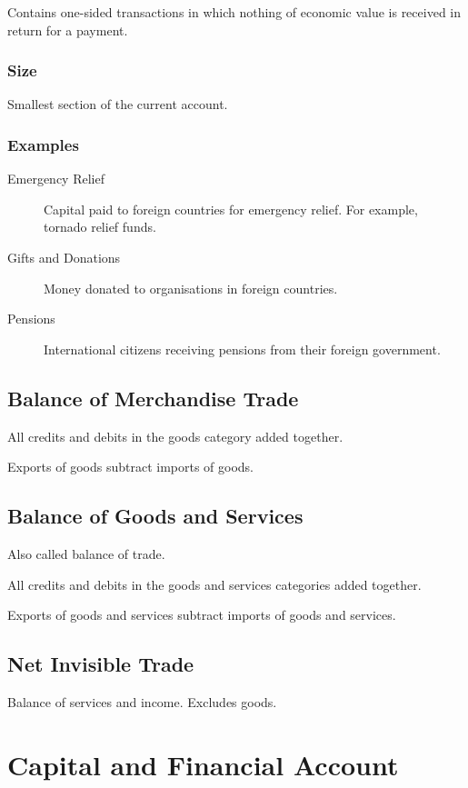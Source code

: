 \documentclass[a4paper,11pt]{report}
\begin{document}
Contains one-sided transactions in which nothing of economic value is received
in return for a payment.

\subsubsection{Size}

Smallest section of the current account.

\subsubsection{Examples}

\begin{description}
\item [Emergency Relief] Capital paid to foreign countries for emergency
	relief. For example, tornado relief funds.
\item [Gifts and Donations] Money donated to organisations in foreign countries.
\item [Pensions] International citizens receiving pensions from their foreign
	government.
\end{description}

\subsection{Balance of Merchandise Trade}

All credits and debits in the goods category added together.

Exports of goods subtract imports of goods.

\subsection{Balance of Goods and Services}

Also called balance of trade.

All credits and debits in the goods and services categories added together.

Exports of goods and services subtract imports of goods and services.

\subsection{Net Invisible Trade}

Balance of services and income. Excludes goods.


\section{Capital and Financial Account}
\end{document}
